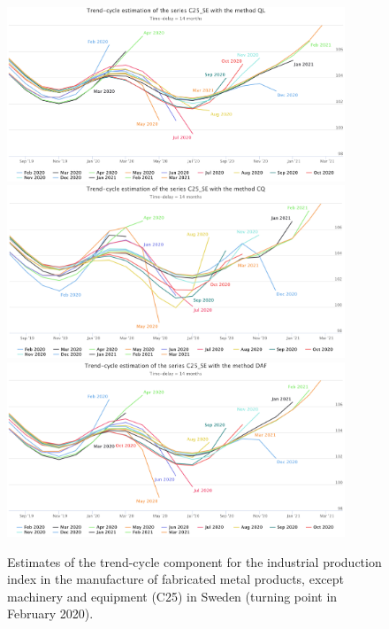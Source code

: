 \documentclass[fleqn,10pt]{latex/stylish_article} %
\newcommand\1{\mathds{1}}
\begin{document}
\begin{figure}\centering
\includegraphics[width=0.9\textwidth]{img/C25SE_ql} 
\includegraphics[width=0.9\textwidth]{img/C25SE_cq}
\includegraphics[width=0.9\textwidth]{img/C25SE_daf}
\caption{Estimates of the trend-cycle component for the industrial production index in the manufacture of fabricated metal products, except machinery and equipment (C25) in Sweden (turning point in February 2020).}
\label{fig:C25SEp2}
\end{figure}



\makeatletter

\makeatother


\end{document}
